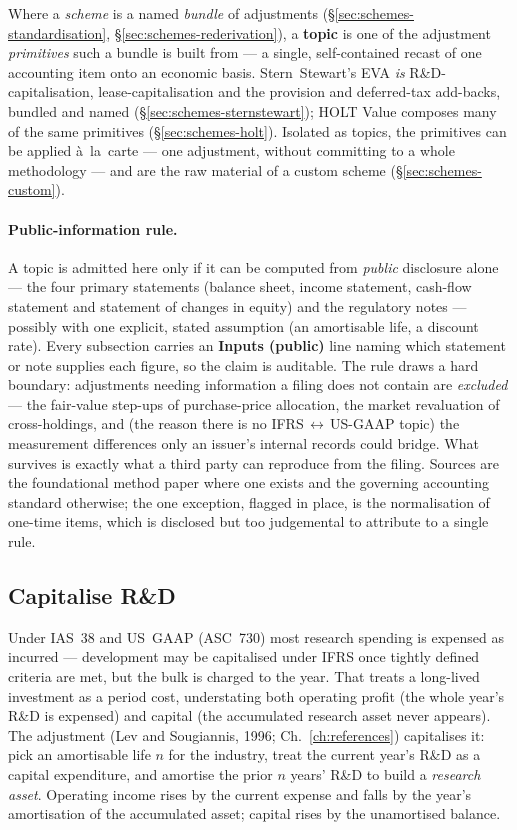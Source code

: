 \documentclass[11pt,a4paper]{report}
\begin{document}
Where a \emph{scheme} is a named \emph{bundle} of adjustments (\S\ref{sec:schemes-standardisation},
\S\ref{sec:schemes-rederivation}), a \textbf{topic} is one of the adjustment \emph{primitives} such a bundle is
built from --- a single, self-contained recast of one accounting item onto an economic basis. Stern~Stewart's
EVA \emph{is} R\&D-capitalisation, lease-capitalisation and the provision and deferred-tax add-backs, bundled
and named (\S\ref{sec:schemes-sternstewart}); HOLT Value composes many of the same primitives
(\S\ref{sec:schemes-holt}). Isolated as topics, the primitives can be applied \`a~la~carte --- one adjustment,
without committing to a whole methodology --- and are the raw material of a custom scheme
(\S\ref{sec:schemes-custom}).

\paragraph{Public-information rule.} A topic is admitted here only if it can be computed from \emph{public}
disclosure alone --- the four primary statements (balance sheet, income statement, cash-flow statement and
statement of changes in equity) and the regulatory notes --- possibly with one explicit, stated assumption (an
amortisable life, a discount rate). Every subsection carries an \textbf{Inputs (public)} line naming which
statement or note supplies each figure, so the claim is auditable. The rule draws a hard boundary: adjustments
needing information a filing does not contain are \emph{excluded} --- the fair-value step-ups of purchase-price
allocation, the market revaluation of cross-holdings, and (the reason there is no
IFRS\,$\leftrightarrow$\,US-GAAP topic) the measurement differences only an issuer's internal records could
bridge. What survives is exactly what a third party can reproduce from the filing. Sources are the foundational
method paper where one exists and the governing accounting standard otherwise; the one exception, flagged in
place, is the normalisation of one-time items, which is disclosed but too judgemental to attribute to a single
rule.

\subsection{Capitalise R\&D}
\label{sec:topics-rnd}
Under IAS~38 and US~GAAP (ASC~730) most research spending is expensed as incurred --- development may be
capitalised under IFRS once tightly defined criteria are met, but the bulk is charged to the year. That treats
a long-lived investment as a period cost, understating both operating profit (the whole year's R\&D is
expensed) and capital (the accumulated research asset never appears). The adjustment (Lev and Sougiannis, 1996;
Ch.~\ref{ch:references}) capitalises it: pick an amortisable life $n$ for the industry, treat the current
year's R\&D as a capital expenditure, and amortise the prior $n$ years' R\&D to build a \emph{research asset}.
Operating income rises by the current expense and falls by the year's amortisation of the accumulated asset;
capital rises by the unamortised balance.
\end{document}
